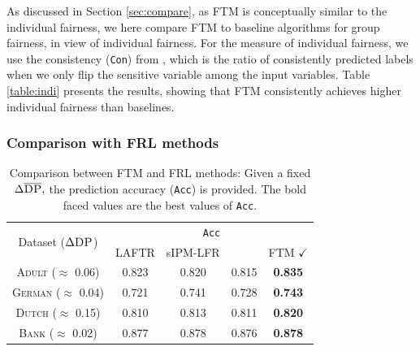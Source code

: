\documentclass[10pt]{article} %
\begin{document}
As discussed in Section \ref{sec:compare}, as FTM is conceptually similar to the individual fairness, we here compare FTM to baseline algorithms for group fairness, in view of individual fairness.
For the measure of individual fairness, we use the consistency (\texttt{Con}) from \citet{Yurochkin2020Training, yurochkin2021sensei}, which is the ratio of consistently predicted labels when we only flip the sensitive variable among the input variables.
Table \ref{table:indi} presents the results, showing that FTM consistently achieves higher  individual fairness than baselines.



\subsubsection{Comparison with FRL methods}\label{sec:add_exps_frl}

\begin{table}[h]
    \centering
    \footnotesize
    \caption{
    Comparison between FTM and FRL methods:
    Given a fixed $\Delta \overline{\textsc{DP}},$ the prediction accuracy (\texttt{Acc}) is provided.
    The bold faced values are the best values of \texttt{Acc}.
    }
    \label{table:compare_gordaliza}
    \begin{tabular}{c||c|c|c|c}
        \toprule
        \multirow{2}{*}{Dataset ($\Delta \textsc{DP}$)} & \multicolumn{4}{c}{\texttt{Acc}} \\
        & LAFTR & sIPM-LFR & \citet{pmlr-v97-gordaliza19a} & FTM $\checkmark$ \\
        \midrule
        \midrule
        \textsc{Adult} ($\approx$ 0.06) & 0.823 & 0.820 & 0.815 & \textbf{0.835} \\
        \midrule
        \textsc{German} ($\approx$ 0.04) & 0.721 & 0.741 & 0.728 & \textbf{0.743} \\
        \midrule
        \textsc{Dutch} ($\approx$ 0.15) & 0.810 & 0.813 & 0.811 & \textbf{0.820} \\
        \midrule
        \textsc{Bank} ($\approx$ 0.02) & 0.877 & 0.878 & 0.876 & \textbf{0.878} \\
        \bottomrule
    \end{tabular}
    \vskip -0.1in
\end{table}
\end{document}
